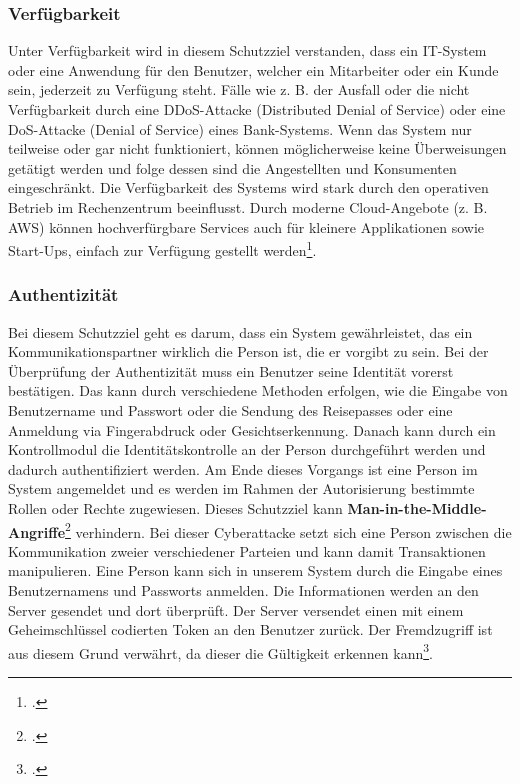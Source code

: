 \subsubsection{Verfügbarkeit}
Unter Verfügbarkeit wird in diesem Schutzziel verstanden, dass ein IT-System oder eine Anwendung für den Benutzer, welcher ein Mitarbeiter oder ein Kunde sein, jederzeit zu Verfügung steht. Fälle wie z. B. der Ausfall oder die nicht Verfügbarkeit durch eine DDoS-Attacke (Distributed Denial of Service) oder eine DoS-Attacke (Denial of Service) eines Bank-Systems. Wenn das System nur teilweise oder gar nicht funktioniert, können möglicherweise keine Überweisungen getätigt werden und folge dessen sind die Angestellten und Konsumenten eingeschränkt. 
Die Verfügbarkeit des Systems wird stark durch den operativen Betrieb im Rechenzentrum beeinflusst. Durch moderne Cloud-Angebote (z. B. AWS) können hochverfürgbare Services auch für kleinere Applikationen sowie Start-Ups, einfach zur Verfügung gestellt werden\footcite{Lehrunterlagen-HTL-cloud}.

\subsubsection{Authentizität}
Bei diesem Schutzziel geht es darum, dass ein System gewährleistet, das ein Kommunikationspartner wirklich die Person ist, die er vorgibt zu sein. Bei der Überprüfung der Authentizität muss ein Benutzer seine Identität vorerst bestätigen. Das kann durch verschiedene Methoden erfolgen, wie die Eingabe von Benutzername und Passwort oder die Sendung des Reisepasses oder eine Anmeldung via Fingerabdruck oder Gesichtserkennung. Danach kann durch ein Kontrollmodul die Identitätskontrolle an der Person durchgeführt werden und dadurch authentifiziert werden. Am Ende dieses Vorgangs ist eine Person im System angemeldet und es werden im Rahmen der Autorisierung bestimmte Rollen oder Rechte zugewiesen.
Dieses Schutzziel kann \textbf{Man-in-the-Middle-Angriffe}\footcite{man-in-middle} verhindern. Bei dieser Cyberattacke setzt sich eine Person zwischen die Kommunikation zweier verschiedener Parteien und kann damit Transaktionen manipulieren. 
Eine Person kann sich in unserem System durch die Eingabe eines Benutzernamens und Passworts anmelden. Die Informationen werden an den Server gesendet und dort überprüft. Der Server versendet einen mit einem Geheimschlüssel codierten Token an den Benutzer zurück. Der Fremdzugriff ist aus diesem Grund verwährt, da dieser die Gültigkeit erkennen kann\footcite{Lehrunterlagen-HTL-cloud}.

